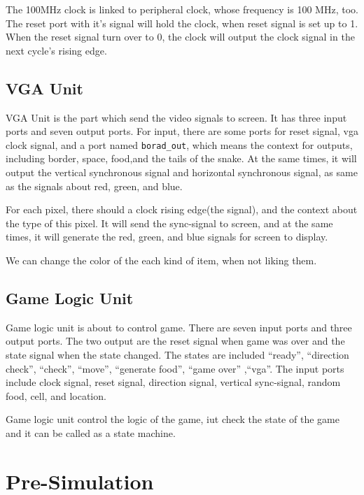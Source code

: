 \documentclass{article}
\begin{document}
    The 100MHz clock is linked to peripheral clock, whose frequency is 100 MHz, too.
    The reset port with it's signal will hold the clock, when reset signal is set up to 1.
    When the reset signal turn over to 0, the clock will output the clock signal in the next cycle's rising edge.
    
    \subsection{VGA Unit}
    \label{sec:vgaunit}
    
    VGA Unit is the part which send the video signals to screen. It has three input ports and seven output ports.
    For input, there are some ports for reset signal, vga clock signal, and a port named \verb|borad_out|,
    which means the context for outputs, including border, space, food,and the tails of the snake.
    At the same times, it will output the vertical synchronous signal and horizontal synchronous signal,
    as same as the signals about red, green, and blue.
    
    For each pixel, there should a clock rising edge(the signal), and the context about the type of this pixel.
    It will send the sync-signal to screen, and at the same times, it will generate the red, green, and blue signals for
    screen to display.
    
    We can change the color of the each kind of item, when not liking them.
     
     \subsection{Game Logic Unit}
     \label{sec:gamelogicunit}

     Game logic unit is about to control game. There are seven input ports and three output ports. 
     The two output are the reset signal when game was over and the state signal when the state changed.
     The states are included ``ready'', ``direction check'', ``check'', ``move'',
     ``generate food'', ``game over'' ,``vga''.
     The input ports include clock signal, reset signal, direction signal, vertical sync-signal,
     random food, cell, and location. 
    
    Game logic unit control the logic of the game, iut check the state of the game and it can 
    be called as a state machine.
    
    \section{Pre-Simulation}
    \label{sec:presimulation}
    
\end{document}
